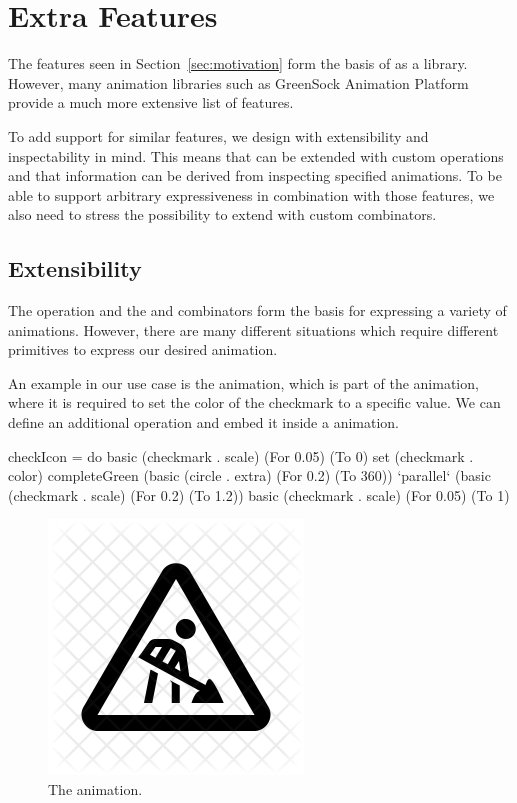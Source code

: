 \section{Extra Features}
\label{sec:features}

The features seen in Section~\ref{sec:motivation} form the basis of \dsl{} as a library. However, many animation libraries such as GreenSock Animation Platform provide a much more extensive list of features.

To add support for similar features, we design \dsl{} with extensibility and inspectability in mind. This means that \dsl{} can be extended with custom operations and that information can be derived from inspecting specified animations. To be able to support arbitrary expressiveness in combination with those features, we also need to stress the possibility to extend \dsl{} with custom combinators.

\subsection{Extensibility}
\label{sec:customop}

The  operation and the  and  combinators form the basis for expressing a variety of animations. However, there are many different situations which require different primitives to express our desired animation.

An example in our use case is the  animation, which is part of the  animation, where it is required to set the color of the checkmark to a specific value. We can define an additional  operation and embed it inside a \dsl{} animation.

\begin{spec}
checkIcon = do
  basic (checkmark . scale) (For 0.05) (To 0)
  set (checkmark . color) completeGreen
  (basic (circle . extra) (For 0.2) (To 360))
    `parallel`
    (basic (checkmark . scale) (For 0.2) (To 1.2))
  basic (checkmark . scale) (For 0.05) (To 1)
\end{spec}

\begin{figure}[h]
\centering
\includegraphics[width=\figscale\textwidth]{pictures/todo}
\caption{The  animation.}
\label{fig:}
\end{figure}

